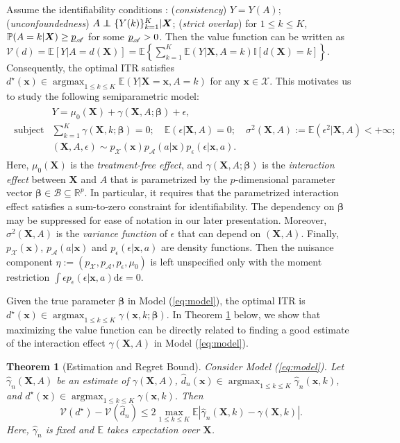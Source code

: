 \documentclass[11pt]{article}
\newtheorem{thm}{Theorem}
\theoremstyle{definition}
\theoremstyle{remark}
\newcommand{\bx}{\bm{x}}
\newcommand{\bX}{\bm{X}}
\newcommand{\bbeta}{\bm{\beta}}
\newcommand{\bbE}{\mathbb{E}}
\newcommand{\bbI}{\mathbb{I}}
\newcommand{\bbP}{\mathbb{P}}
\newcommand{\bbR}{\mathbb{R}}
\newcommand{\cV}{\mathcal{V}}
\newcommand{\cX}{\mathcal{X}}
\newcommand{\sA}{\mathscr{A}}
\newcommand{\sB}{\mathscr{B}}
\newcommand{\sX}{\mathscr{X}}
\newcommand{\argmax}{\mathop{\mathrm{argmax}}}
\newcommand{\bbone}{\bbI}	%
\newcommand\indep{\protect\mathpalette{\protect\independenT}{\perp}}
\def\independenT#1#2{\mathrel{\rlap{$#1#2$}\mkern2mu{#1#2}}}	%
\def\ubar#1{\underbar{$ #1 $}}
\newcommand{\rd}{\mathrm{d}}
\begin{document}
Assume the identifiability conditions \citep{rubin1974estimating}: (\textit{consistency}) $ Y = Y(A) $; (\textit{unconfoundedness}) $ A \indep \{ Y(k) \}_{k=1}^{K} | \bX $; (\textit{strict overlap}) for $ 1 \le k \le K $, $ \bbP(A = k|\bX)  \ge \ubar{p}_{\sA} $ for some $ \ubar{p}_{\sA} > 0 $. Then the value function can be written as $ \cV(d) = \bbE[Y|A=d(\bX)] = \bbE\left\{ \sum_{k=1}^{K}\bbE(Y|\bX,A=k)\bbone[d(\bX) = k]\right\} $. Consequently, the optimal ITR satisfies $ d^{\star}(\bx) \in \argmax_{1 \le k \le K}\bbE(Y|\bX=\bx,A=k) $ for any $ \bx \in \cX $. This motivates us to study the following semiparametric model:
\begin{align}
	\begin{array}{rl}
		&Y = \mu_{0}(\bX) + \gamma(\bX,A;\bbeta) +  \epsilon,\\
		\text{subject to} & \sum\limits_{k=1}^{K}\gamma(\bX,k;\bbeta) = 0; \quad \bbE(\epsilon|\bX,A) = 0; \quad \sigma^{2}(\bX,A) := \bbE(\epsilon^{2}|\bX,A) < +\infty; \\
		& (\bX,A,\epsilon) \sim p_{\sX}(\bx)p_{\sA}(a|\bx)p_{\epsilon}(\epsilon|\bx,a).
	\end{array} \label{eq:model}
\end{align}
Here, $ \mu_{0}(\bX) $ is the \textit{treatment-free effect}, and $ \gamma(\bX,A;\bbeta) $ is the \textit{interaction effect} between $ \bX $ and $ A $ that is parametrized by the $ p $-dimensional parameter vector $ \bbeta \in \sB \subseteq \bbR^{p} $. In particular, it requires that the parametrized interaction effect satisfies a sum-to-zero constraint for identifiability. The dependency on $ \bbeta $ may be suppressed for ease of notation in our later presentation. Moreover, $ \sigma^{2}(\bX,A) $ is the \textit{variance function} of $ \epsilon $ that can depend on $ (\bX,A) $. Finally, $ p_{\sX}(\bx) $, $ p_{\sA}(a|\bx) $ and $ p_{\epsilon}(\epsilon|\bx,a) $ are density functions. Then the nuisance component $ \eta := (p_{\sX},p_{\sA},p_{\epsilon},\mu_{0}) $ is left unspecified only with the moment restriction $ \int \epsilon p_{\epsilon}(\epsilon|\bx,a)\rd \epsilon = 0 $.  

Given the true parameter $ \bbeta $ in Model (\ref{eq:model}), the optimal ITR is $ d^{\star}(\bx) \in \argmax_{1 \le k \le K}\gamma(\bx,k;\bbeta) $. In Theorem \ref{thm:regret_est} below, we  show that maximizing the value function can be directly related to finding a good estimate of the interaction effect $ \gamma(\bX,A) $ in Model (\ref{eq:model}). 

\begin{thm}[Estimation and Regret Bound]\label{thm:regret_est}
	Consider Model (\ref{eq:model}). Let $ \widehat{\gamma}_{n}(\bX,A) $ be an estimate of $ \gamma(\bX,A) $, $ \widehat{d}_{n}(\bx) \in \argmax_{1 \le k \le K}\widehat{\gamma}_{n}(\bx,k) $, and $ d^{\star}(\bx) \in \argmax_{1 \le k \le K}\gamma(\bx,k) $. Then
	\[ \cV(d^{\star}) - \cV(\widehat{d}_{n}) \le 2\max_{1 \le k \le K}\bbE\left |\widehat{\gamma}_{n}(\bX,k) - \gamma(\bX,k)\right |. \]
	Here, $ \widehat{\gamma}_{n} $ is fixed and $ \bbE $ takes expectation over $ \bX $.
\end{thm}
\end{document}
